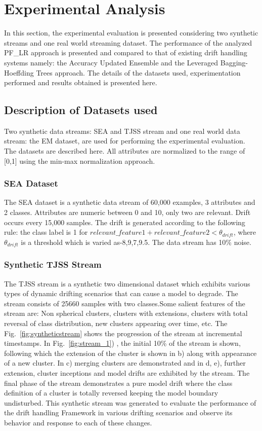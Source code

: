 \documentclass[conference]{IEEEtran}
\begin{document}
\section{Experimental Analysis}
In this section, the experimental evaluation is presented considering two synthetic streams and one real world streaming dataset. The performance of the analyzed PF\_LR approach is presented and compared to that of existing drift handling systems namely: the Accuracy Updated Ensemble and the Leveraged Bagging-Hoeffding Trees approach. The details of the datasets used, experimentation performed and results obtained is presented here.

\subsection{Description of Datasets used}
Two synthetic data streams: SEA \cite{Street and Kim(2001)} and TJSS stream and one real world data stream: the EM dataset\cite{Gong-De etal(2012)}\cite{Harries}, are used for performing the experimental evaluation. The datasets are described here. All attributes are normalized to the range of [0,1] using the min-max normalization approach.

\subsubsection{SEA Dataset}
The SEA dataset is a synthetic data stream of 60,000 examples, 3 attributes and 2 classes. Attributes are numeric between 0 and 10, only two are relevant. Drift occurs every 15,000 samples. The drift is generated according to the following rule: the class label is 1 for $relevant\_feature1+relevant\_feature2 < \theta_{drift}$, where $\theta_{drift}$ is a threshold which is varied as-{8,9,7,9.5}. The data stream has 10\% noise. 

\subsubsection{Synthetic TJSS Stream }
\label{sec:syntheticstream}

The TJSS stream is a synthetic two dimensional dataset which exhibits various types of dynamic drifting scenarios that can cause a model to degrade. The stream consists of 25660 samples with two classes.Some salient features of the stream are: Non spherical clusters, clusters with extensions, clusters with total reversal of class distribution, new clusters appearing over time, etc. The Fig.~\ref{fig:syntheticstream} shows the progression of the stream at incremental timestamps. In Fig.~\ref{fig:stream_1}) , the initial 10\% of the stream is shown, following which the extension of the cluster is shown in b) along with appearance of a new cluster. In c) merging clusters are demonstrated and in d, e), further extension, cluster inceptions and model drifts are exhibited by the stream. The final phase of the stream demonstrates a pure model drift where the class definition of a cluster is totally reversed keeping the model boundary undisturbed. This synthetic stream was generated to evaluate the performance of the drift handling Framework in various drifting scenarios and observe its behavior and response to each of these changes.
\end{document}
